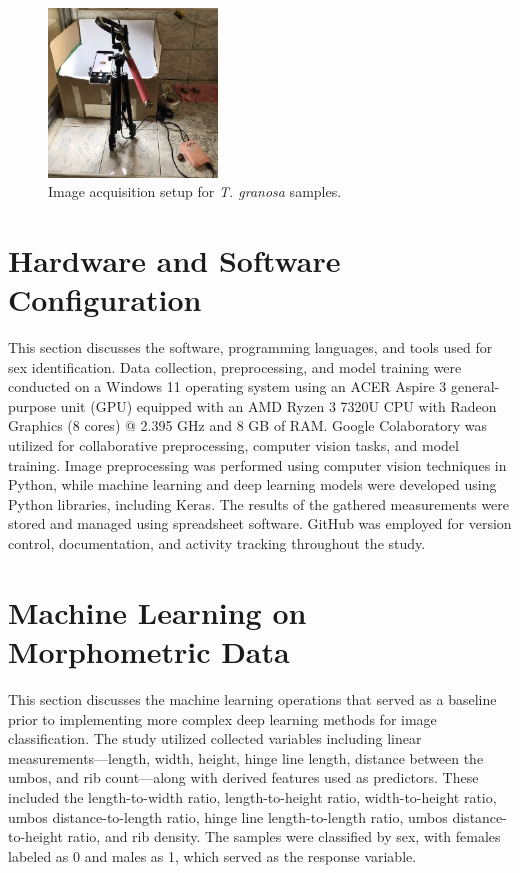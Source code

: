 \begin{figure}[!htbp]
	\centering
	\includegraphics[width=0.4\textwidth]{figures/setup.jpg}
	\caption{Image acquisition setup for \textit{T. granosa} samples.}
	\label{fig:setup}
\end{figure}

\section{Hardware and Software Configuration}

This section discusses the software, programming languages, and tools used for sex identification. Data collection, preprocessing, and model training were conducted on a Windows 11 operating system using an ACER Aspire 3 general-purpose unit (GPU) equipped with an AMD Ryzen 3 7320U CPU with Radeon Graphics (8 cores) @ 2.395 GHz and 8 GB of RAM. Google Colaboratory was utilized for collaborative preprocessing, computer vision tasks, and model training. Image preprocessing was performed using computer vision techniques in Python, while machine learning and deep learning models were developed using Python libraries, including Keras. The results of the gathered measurements were stored and managed using spreadsheet software. GitHub was employed for version control, documentation, and activity tracking throughout the study.

\section{Machine Learning on Morphometric Data}
\label{sec:ml models}

This section discusses the machine learning operations that served as a baseline prior to implementing more complex deep learning methods for image classification. The study utilized collected variables including linear measurements—length, width, height, hinge line length, distance between the umbos, and rib count—along with derived features used as predictors. These included the length-to-width ratio, length-to-height ratio, width-to-height ratio, umbos distance-to-length ratio, hinge line length-to-length ratio, umbos distance-to-height ratio, and rib density. The samples were classified by sex, with females labeled as 0 and males as 1, which served as the response variable.

